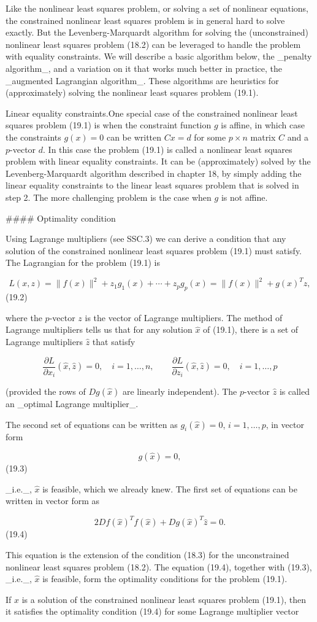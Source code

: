 Like the nonlinear least squares problem, or solving a set of nonlinear equations, the constrained nonlinear least squares problem is in general hard to solve exactly. But the Levenberg-Marquardt algorithm for solving the (unconstrained) nonlinear least squares problem (18.2) can be leveraged to handle the problem with equality constraints. We will describe a basic algorithm below, the _penalty algorithm_, and a variation on it that works much better in practice, the _augmented Lagrangian algorithm_. These algorithms are heuristics for (approximately) solving the nonlinear least squares problem (19.1).

Linear equality constraints.One special case of the constrained nonlinear least squares problem (19.1) is when the constraint function \(g\) is affine, in which case the constraints \(g(x)=0\) can be written \(Cx=d\) for some \(p\times n\) matrix \(C\) and a \(p\)-vector \(d\). In this case the problem (19.1) is called a nonlinear least squares problem with linear equality constraints. It can be (approximately) solved by the Levenberg-Marquardt algorithm described in chapter 18, by simply adding the linear equality constraints to the linear least squares problem that is solved in step 2. The more challenging problem is the case when \(g\) is not affine.

#### Optimality condition

Using Lagrange multipliers (see SSC.3) we can derive a condition that any solution of the constrained nonlinear least squares problem (19.1) must satisfy. The Lagrangian for the problem (19.1) is

\[L(x,z)=\|f(x)\|^{2}+z_{1}g_{1}(x)+\cdots+z_{p}g_{p}(x)=\|f(x)\|^{2}+g(x)^{T}z,\] (19.2)

where the \(p\)-vector \(z\) is the vector of Lagrange multipliers. The method of Lagrange multipliers tells us that for any solution \(\hat{x}\) of (19.1), there is a set of Lagrange multipliers \(\hat{z}\) that satisfy

\[\frac{\partial L}{\partial x_{i}}(\hat{x},\hat{z})=0,\quad i=1,\ldots,n,\qquad \frac{\partial L}{\partial z_{i}}(\hat{x},\hat{z})=0,\quad i=1,\ldots,p\]

(provided the rows of \(Dg(\hat{x})\) are linearly independent). The \(p\)-vector \(\hat{z}\) is called an _optimal Lagrange multiplier_.

The second set of equations can be written as \(g_{i}(\hat{x})=0\), \(i=1,\ldots,p\), in vector form

\[g(\hat{x})=0,\] (19.3)

_i.e._, \(\hat{x}\) is feasible, which we already knew. The first set of equations can be written in vector form as

\[2Df(\hat{x})^{T}f(\hat{x})+Dg(\hat{x})^{T}\hat{z}=0.\] (19.4)

This equation is the extension of the condition (18.3) for the unconstrained nonlinear least squares problem (18.2). The equation (19.4), together with (19.3), _i.e._, \(\hat{x}\) is feasible, form the optimality conditions for the problem (19.1).

If \(\hat{x}\) is a solution of the constrained nonlinear least squares problem (19.1), then it satisfies the optimality condition (19.4) for some Lagrange multiplier vector 